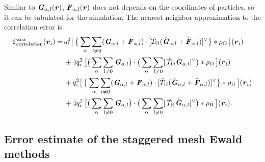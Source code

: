 \documentclass[aps,pre,preprint]{revtex4}
\renewcommand{\v}[1]{\textbf{\textit{#1}}}
\begin{document}
Similar to $\v G_{\alpha,l}(\v r)$,
$\v F_{\alpha,l} (\v r)$ 
does not depends on the coordinates of particles,
so it can be tabulated  for the simulation.
The nearest neighbor approximation to the correlation error is
\begin{align}\nonumber
  \mathcal E^{\textrm{ana}}_{\textrm{correlation}}(\v r_i)
  =\,&
  q_i^2
  \big[\,
  \big\{
  \sum_{\alpha} \sum_{l\neq 0}
  (\v G_{\alpha,l}+\v F_{\alpha,l})\cdot
  [\hat T_{\textrm{O}} (\hat{\v G}_{\alpha,l}+\hat{\v F}_{\alpha,l})]^{\vee}
  \big\}
  \ast \rho_{\textrm{O}}
  \,\big] (\v r_i) \\\nonumber
  \,&+
  4q_i^2\,
  \big[
  \big(
  \sum_{\alpha} \sum_{l\neq 0}  
  \v G_{\alpha,l}
  \big)
  \cdot
  \big(
  \sum_{\alpha} \sum_{l\neq 0}  
  [\,\hat T_{\textrm{O}}\hat{\v G}_{\alpha,l}]^{\vee}
  \big)
  \ast \rho_{\textrm{O}}\,
  \big] (\v r_i) \\\nonumber
  \,&+
  q_i^2
  \big[\,
  \big\{
  \sum_{\alpha} \sum_{l\neq 0}
  (\v G_{\alpha,l}+\v F_{\alpha,l})\cdot
  [\hat T_{\textrm{H}} (\hat{\v G}_{\alpha,l}+\hat{\v F}_{\alpha,l})]^{\vee}
  \big\}
  \ast \rho_{\textrm{H}}
  \,\big] (\v r_i) \\
  \,&+
  4q_i^2\,
  \big[
  \big(
  \sum_{\alpha} \sum_{l\neq 0}  
  \v G_{\alpha,l}
  \big)
  \cdot
  \big(
  \sum_{\alpha} \sum_{l\neq 0}  
  [\,\hat T_{\textrm{H}}\hat{\v G}_{\alpha,l}]^{\vee}
  \big)
  \ast \rho_{\textrm{H}}\,
  \big] (\v r_i).
\end{align}



\subsection{Error estimate of the staggered mesh Ewald methods}
\end{document}
